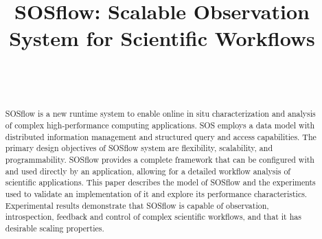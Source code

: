 
\title{SOSflow: Scalable Observation System for Scientific Workflows}

\author{
        \\
        \\
}

\maketitle



\begin{abstract} %
SOSflow is a new runtime system to enable online in situ
characterization and analysis of complex high-performance computing
applications.
%
SOS employs a data model with distributed information management and
structured query and access capabilities.
%
The primary design objectives of SOSflow system are flexibility,
scalability, and programmability.
%
SOSflow provides a complete framework that can be configured with and
used directly by an application, allowing for a detailed workflow
analysis of scientific applications.
%
This paper describes the model of SOSflow and
the experiments used to validate an implementation of it and explore its
performance characteristics.
%
Experimental results demonstrate that SOSflow is capable of
observation, introspection, feedback and control of complex scientific
workflows, and that it has desirable scaling properties.
%
%


\end{abstract}


